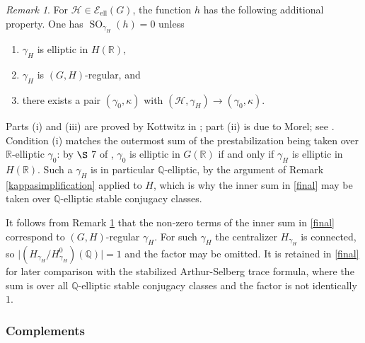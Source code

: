 \documentclass[11pt,a4paper]{article}
\newcommand{\Eell}{\mathcal{E}_{\mathrm{ell}}}
\theoremstyle{definition}
\theoremstyle{plain}
\theoremstyle{remark}
\newtheorem{R}[shared]{Remark}
\theoremstyle{plain}
\DeclareMathOperator{\SO}{SO}
\begin{document}
\begin{R}\label{SOvanishing}
    For $\mathcal{H} \in \Eell(G)$, the function $h$ has the following additional property. One has $\SO_{\gamma_H}(h) = 0$ unless
    \begin{enumerate}
        \item[(i)] $\gamma_H$ is elliptic in $H(\mathbb{R})$,
        \item[(ii)] $\gamma_H$ is $(G,H)$-regular, and
        \item[(iii)] there exists a pair $(\gamma_0, \kappa)$ with $(\mathcal{H}, \gamma_H) \xrightarrow[]{} (\gamma_0, \kappa)$.
    \end{enumerate}
    Parts (i) and (iii) are proved by Kottwitz in \cite{MR1044820}; part (ii) is due to Morel; see \cite[Prop.~3.3.4, Rem.~3.3.5]{MR2567740}. Condition (i) matches the outermost sum of the prestabilization being taken over $\mathbb{R}$-elliptic $\gamma_0$: by $\S$ 7 of \cite{MR1044820}, $\gamma_0$ is elliptic in $G(\mathbb{R})$ if and only if $\gamma_H$ is elliptic in $H(\mathbb{R})$. Such a $\gamma_H$ is in particular $\mathbb{Q}$-elliptic, by the argument of Remark \ref{kappasimplification} applied to $H$, which is why the inner sum in \eqref{final} may be taken over $\mathbb{Q}$-elliptic stable conjugacy classes.
\end{R}

It follows from Remark \ref{SOvanishing} that the non-zero terms of the inner sum in \eqref{final} correspond to $(G,H)$-regular $\gamma_H$. For such $\gamma_H$ the centralizer $H_{\gamma_H}$ is connected, so $\mid (H_{\gamma_H}/H_{\gamma_H}^0)(\mathbb{Q}) \mid = 1$ and the factor may be omitted. It is retained in \eqref{final} for later comparison with the stabilized Arthur-Selberg trace formula, where the sum is over all $\mathbb{Q}$-elliptic stable conjugacy classes and the factor is not identically $1$.


\subsubsection*{Complements}
\end{document}
